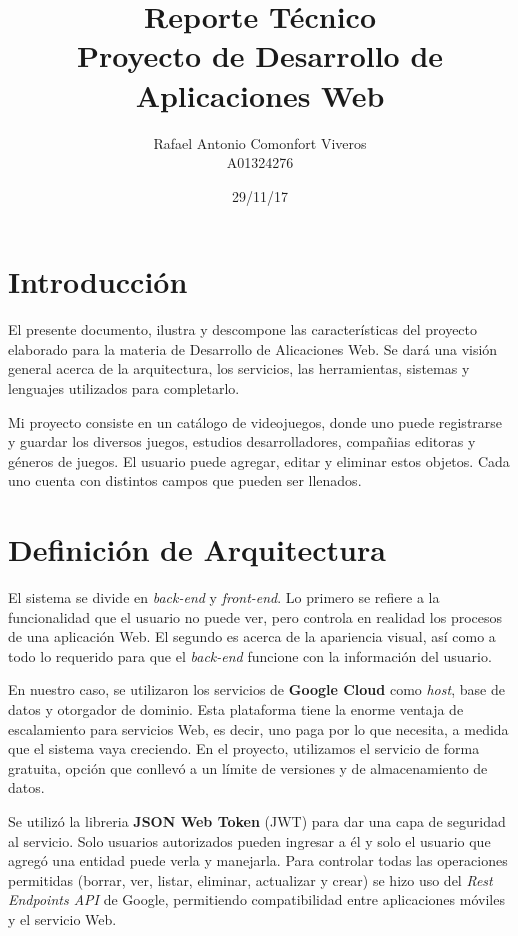 \documentclass[12pt]{article}
\begin{document}
\title{Reporte Técnico\\Proyecto de Desarrollo de Aplicaciones Web}
\author{Rafael Antonio Comonfort Viveros\\A01324276}
\date{29/11/17}
\maketitle

\tableofcontents
\vspace{150pt}


\section{Introducción}

El presente documento, ilustra y descompone las características del proyecto elaborado para la materia de Desarrollo de Alicaciones Web. Se dará una visión general acerca de la arquitectura, los servicios, las herramientas, sistemas y lenguajes utilizados para completarlo. 

Mi proyecto consiste en un catálogo de videojuegos, donde uno puede registrarse y guardar los diversos juegos, estudios desarrolladores, compañias editoras y géneros de juegos. El usuario puede agregar, editar y eliminar estos objetos. Cada uno cuenta con distintos campos que pueden ser llenados. 

\section{Definición de Arquitectura} 
El sistema se divide en \textit{back-end} y \textit{front-end}. Lo primero se refiere a la funcionalidad que el usuario no puede ver, pero controla en realidad los procesos de una aplicación Web. El segundo es acerca de la apariencia visual, así como a todo lo requerido para que el \textit{back-end} funcione con la información del usuario.

En nuestro caso, se utilizaron los servicios de \textbf{Google Cloud} como \textit{host}, base de datos y otorgador de dominio. Esta plataforma tiene la enorme ventaja de escalamiento para servicios Web, es decir, uno paga por lo que necesita, a medida que el sistema vaya creciendo. En el proyecto, utilizamos el servicio de forma gratuita, opción que conllevó a un límite de versiones y de almacenamiento de datos.

Se utilizó la libreria \textbf{JSON Web Token} (JWT) para dar una capa de seguridad al servicio. Solo usuarios autorizados pueden ingresar a él y solo el usuario que agregó una entidad puede verla y manejarla. Para controlar todas las operaciones permitidas (borrar, ver, listar, eliminar, actualizar y crear) se hizo uso del \textit{Rest Endpoints API} de Google, permitiendo compatibilidad entre aplicaciones móviles y el servicio Web. 
\end{document}

